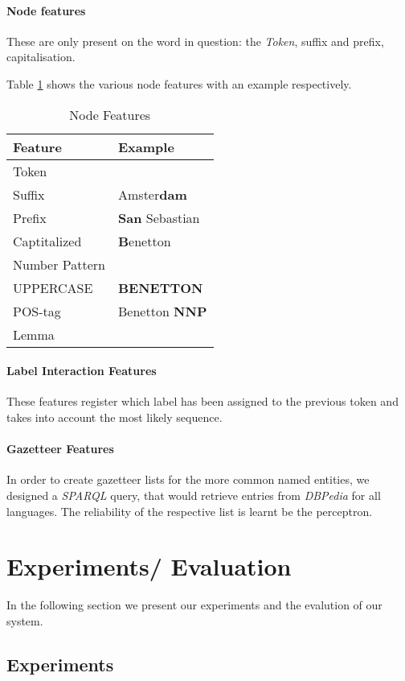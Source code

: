 \documentclass[11pt]{article}
\begin{document}
\paragraph*{Node features}
These are only present on the word in question: the \emph{Token}, suffix and prefix, capitalisation.

Table \ref{table:node} shows the various node features with an example respectively.

\begin{table}[h!]
\begin{tabular}{l|l}
\hline
\bf Feature & \bf Example \\
\hline
Token &  \\
Suffix& Amster\textbf{dam}\\
Prefix&  \textbf{San} Sebastian\\
Captitalized& \textbf{B}enetton\\
Number Pattern & \\
UPPERCASE &  \textbf{BENETTON}\\
POS-tag &  Benetton \textbf{NNP}   \\
Lemma &   \\
\end{tabular}
\caption{Node Features}
\label{table:node}
\end{table}

\paragraph*{Label Interaction Features}
These features register which label has been assigned to the previous token and takes into account the most likely sequence. 


\paragraph*{Gazetteer Features}
In order to create gazetteer lists for the more common named entities, we designed a \emph{SPARQL} query, that would retrieve entries from \emph{DBPedia} for all
languages. The reliability of the respective list is learnt be the perceptron. 


\section{Experiments/ Evaluation}
In the following section we present our experiments and the evalution of our system.
\subsection*{Experiments}
\end{document}

